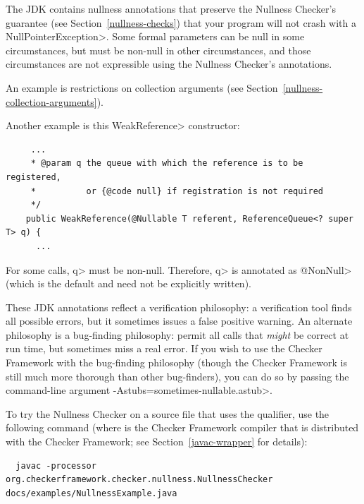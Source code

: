 The JDK contains nullness annotations that preserve the Nullness Checker's
guarantee (see Section~\ref{nullness-checks}) that your program will not
crash with a \<NullPointerException>.  Some formal parameters
can be null in some circumstances, but must be non-null in other
circumstances, and those circumstances are not expressible using the
Nullness Checker's annotations.

An example is restrictions on collection arguments (see
Section~\ref{nullness-collection-arguments}).

Another example is this \<WeakReference> constructor:

\begin{Verbatim}
     ...
     * @param q the queue with which the reference is to be registered,
     *          or {@code null} if registration is not required
     */
    public WeakReference(@Nullable T referent, ReferenceQueue<? super T> q) {
      ...
\end{Verbatim}

For some calls, \<q> must be non-null.  Therefore, \<q> is annotated as
\<@NonNull> (which is the default and need not be explicitly written).

These JDK annotations reflect a verification philosophy:  a verification
tool finds all possible errors, but it sometimes issues a false positive warning.
An alternate philosophy is a bug-finding philosophy:  permit all calls that
\emph{might} be correct at run time, but sometimes miss a real error.  If
you wish to use the Checker Framework with the bug-finding philosophy
(though the Checker Framework is still much more thorough than other
bug-finders), you can do so by passing the command-line argument
\<-Astubs=sometimes-nullable.astub>.




To try the Nullness Checker on a source file that uses the  qualifier,
use the following command (where  is the Checker Framework compiler that
is distributed with the Checker Framework; see Section~\ref{javac-wrapper}
for details):

\begin{smaller}
\begin{Verbatim}
  javac -processor org.checkerframework.checker.nullness.NullnessChecker docs/examples/NullnessExample.java
\end{Verbatim}
\end{smaller}

